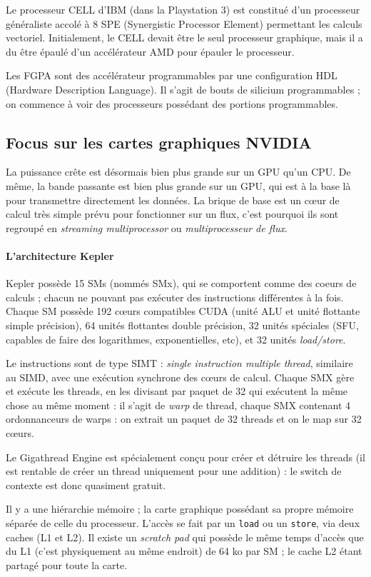\documentclass{article}
\begin{document}
Le processeur CELL d'IBM (dans la Playstation 3) est constitué d'un processeur généraliste accolé à 8 SPE (Synergistic Processor Element) permettant les calculs vectoriel. Initialement, le CELL devait être le seul processeur graphique, mais il a du être épaulé d'un accélérateur AMD pour épauler le processeur.

Les FGPA sont des accélérateur programmables par une configuration HDL (Hardware Description Language). Il s'agit de bouts de silicium programmables ; on commence à voir des processeurs possédant des portions programmables.

\subsection*{Focus sur les cartes graphiques NVIDIA}
La puissance crête est désormais bien plus grande sur un GPU qu'un CPU. De même, la bande passante est bien plus grande sur un GPU, qui est à la base là pour transmettre directement les données. La brique de base est un cœur de calcul très simple prévu pour fonctionner sur un flux, c'est pourquoi ils sont regroupé en \emph{streaming multiprocessor} ou \emph{multiprocesseur de flux}.

\paragraph{L'architecture Kepler}
Kepler possède 15 SMs (nommés SMx), qui se comportent comme des coeurs de calculs ; chacun ne pouvant pas exécuter des instructions différentes à la fois. Chaque SM possède 192 cœurs compatibles CUDA (unité ALU et unité flottante simple précision), 64 unités flottantes double précision, 32 unités spéciales (SFU, capables de faire des logarithmes, exponentielles, etc), et 32 unités \emph{load/store}.

Le instructions sont de type SIMT : \emph{single instruction multiple thread}, similaire au SIMD, avec une exécution synchrone des cœurs de calcul. Chaque SMX gère et exécute les threads, en les divisant par paquet de 32 qui exécutent la même chose au même moment : il s'agit de \emph{warp} de thread, chaque SMX contenant 4 ordonnanceurs de warps : on extrait un paquet de 32 threads et on le map sur 32 cœurs.

Le Gigathread Engine est spécialement conçu pour créer et détruire les threads (il est rentable de créer un thread uniquement pour une addition) : le switch de contexte est donc quasiment gratuit.


Il y a une hiérarchie mémoire ; la carte graphique possédant sa propre mémoire séparée de celle du processeur. L'accès se fait par un \texttt{load} ou un \texttt{store}, via deux caches (L1 et L2). Il existe un \emph{scratch pad} qui possède le même temps d'accès que du L1 (c'est physiquement au même endroit) de 64 ko par SM ; le cache L2 étant partagé pour toute la carte.
\end{document}

